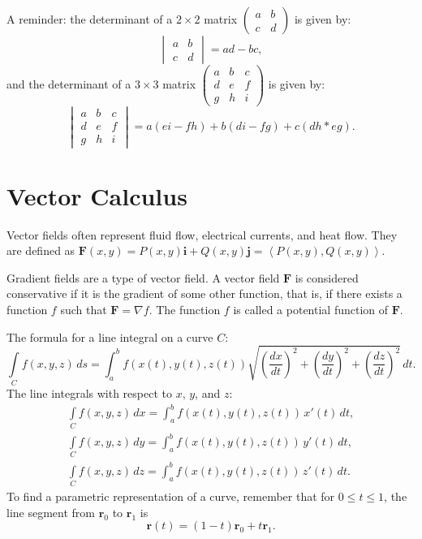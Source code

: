 \documentclass{article}
\begin{document}
A reminder: the determinant of a 
$2 \times 2$ matrix $\begin{pmatrix} a & b \\ c & d \end{pmatrix}$ is given by: 
\[ 
\begin{vmatrix} 
a & b \\ 
c & d 
\end{vmatrix} = ad - bc,
\]
and the determinant of a 
$3 \times 3$ matrix $\begin{pmatrix} a & b & c \\ d & e & f \\ g & h & i \end{pmatrix}$ is given by:
\[
\begin{vmatrix}
    a & b & c \\ 
    d & e & f \\ 
    g & h & i
\end{vmatrix} = 
a(ei - fh) + b(di - fg) + c(dh * eg).
\]

\section*{Vector Calculus}

Vector fields often represent fluid flow, electrical currents, and heat flow.
They are defined as $\mathbf{F}(x,y) = P(x,y)\mathbf{i} + Q(x,y)\mathbf{j}
= \left\langle P(x,y), Q(x,y) \right\rangle$.

Gradient fields are a type of vector field. A vector field $\mathbf{F}$ is 
considered conservative if it is the gradient of some other function, 
that is, if there exists a function $f$ such that $\mathbf{F} = \nabla f$. 
The function $f$ is called a potential function of $\mathbf{F}$.

The formula for a line integral on a curve $C$:
\[
\int \limits_C f(x,y,z) \, ds = 
\int_a^b f(x(t), y(t), z(t))
 \sqrt{\left(\frac{dx}{dt}\right)^2 + \left(\frac{dy}{dt}\right)^2 + \left(\frac{dz}{dt}\right)^2} \, dt.
\]
The line integrals with respect to $x$, $y$, and $z$:
\begin{gather}
    \int \limits_C f(x,y,z) \, dx = \int_{a}^{b} f(x(t), y(t), z(t)) \, x'(t) \, dt, \nonumber \\
    \int \limits_C f(x,y,z) \, dy = \int_{a}^{b} f(x(t), y(t), z(t)) \, y'(t) \, dt, \nonumber \\
    \int \limits_C f(x,y,z) \, dz = \int_{a}^{b} f(x(t), y(t), z(t)) \, z'(t) \, dt. \nonumber
\end{gather}
To find a parametric representation of a curve, remember that for $0 \le t \le 1$,
the line segment from $\mathbf{r}_0$ to $\mathbf{r}_1$ is
\[
\mathbf{r}(t) = (1-t)\mathbf{r}_0 + t\mathbf{r}_1.
\]
\end{document}
